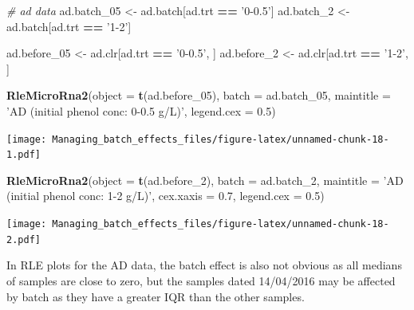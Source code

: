 \documentclass[]{book}
\newenvironment{Shaded}{\begin{snugshade}}{\end{snugshade}}
\newcommand{\KeywordTok}[1]{\textcolor[rgb]{0.13,0.29,0.53}{\textbf{#1}}}
\newcommand{\DataTypeTok}[1]{\textcolor[rgb]{0.13,0.29,0.53}{#1}}
\newcommand{\DecValTok}[1]{\textcolor[rgb]{0.00,0.00,0.81}{#1}}
\newcommand{\FloatTok}[1]{\textcolor[rgb]{0.00,0.00,0.81}{#1}}
\newcommand{\StringTok}[1]{\textcolor[rgb]{0.31,0.60,0.02}{#1}}
\newcommand{\CommentTok}[1]{\textcolor[rgb]{0.56,0.35,0.01}{\textit{#1}}}
\newcommand{\OperatorTok}[1]{\textcolor[rgb]{0.81,0.36,0.00}{\textbf{#1}}}
\newcommand{\NormalTok}[1]{#1}
\begin{document}
\begin{Shaded}
\begin{Highlighting}[]
\CommentTok{# ad data}
\NormalTok{ad.batch_}\DecValTok{05}\NormalTok{ <-}\StringTok{ }\NormalTok{ad.batch[ad.trt }\OperatorTok{==}\StringTok{ '0-0.5'}\NormalTok{]}
\NormalTok{ad.batch_}\DecValTok{2}\NormalTok{ <-}\StringTok{ }\NormalTok{ad.batch[ad.trt }\OperatorTok{==}\StringTok{ '1-2'}\NormalTok{] }

\NormalTok{ad.before_}\DecValTok{05}\NormalTok{ <-}\StringTok{ }\NormalTok{ad.clr[ad.trt }\OperatorTok{==}\StringTok{ '0-0.5'}\NormalTok{, ]}
\NormalTok{ad.before_}\DecValTok{2}\NormalTok{ <-}\StringTok{ }\NormalTok{ad.clr[ad.trt }\OperatorTok{==}\StringTok{ '1-2'}\NormalTok{, ]}

\KeywordTok{RleMicroRna2}\NormalTok{(}\DataTypeTok{object =} \KeywordTok{t}\NormalTok{(ad.before_}\DecValTok{05}\NormalTok{), }\DataTypeTok{batch =}\NormalTok{ ad.batch_}\DecValTok{05}\NormalTok{, }
             \DataTypeTok{maintitle =} \StringTok{'AD (initial phenol conc: 0-0.5 g/L)'}\NormalTok{, }
             \DataTypeTok{legend.cex =} \FloatTok{0.5}\NormalTok{)}
\end{Highlighting}
\end{Shaded}

\texttt{[image: Managing\_batch\_effects\_files/figure-latex/unnamed-chunk-18-1.pdf]}

\begin{Shaded}
\begin{Highlighting}[]
\KeywordTok{RleMicroRna2}\NormalTok{(}\DataTypeTok{object =} \KeywordTok{t}\NormalTok{(ad.before_}\DecValTok{2}\NormalTok{), }\DataTypeTok{batch =}\NormalTok{ ad.batch_}\DecValTok{2}\NormalTok{, }
             \DataTypeTok{maintitle =} \StringTok{'AD (initial phenol conc: 1-2 g/L)'}\NormalTok{, }
             \DataTypeTok{cex.xaxis =} \FloatTok{0.7}\NormalTok{, }\DataTypeTok{legend.cex =} \FloatTok{0.5}\NormalTok{)}
\end{Highlighting}
\end{Shaded}

\texttt{[image: Managing\_batch\_effects\_files/figure-latex/unnamed-chunk-18-2.pdf]}

In RLE plots for the AD data, the batch effect is also not obvious as
all medians of samples are close to zero, but the samples dated
14/04/2016 may be affected by batch as they have a greater IQR than the
other samples.
\end{document}
